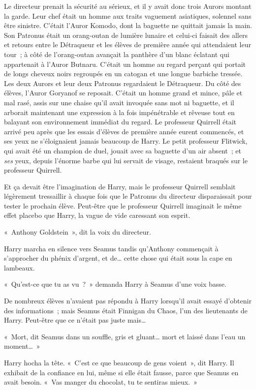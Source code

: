 Le directeur prenait la sécurité au sérieux, et il y avait donc trois Aurors montant la garde.
Leur chef était un homme aux traits vaguement asiatiques, solennel sans être sinistre.
C'était l'Auror Komodo, dont la baguette ne quittait jamais la main.
Son Patronus était un orang-outan de lumière lunaire et celui-ci faisait des allers et retours entre le Détraqueur et les élèves de première année qui attendaient leur tour~; à côté de l'orang-outan avançait la panthère d'un blanc éclatant qui appartenait à l'Auror Butnaru.
C'était un homme au regard perçant qui portait de longs cheveux noirs regroupés en un catogan et une longue barbiche tressée.
Les deux Aurors et leur deux Patronus regardaient le Détraqueur.
Du côté des élèves, l'Auror Goryanof se reposait.
C'était un homme grand et mince, pâle et mal rasé, assis sur une chaise qu'il avait invoquée sans mot ni baguette, et il arborait maintenant une expression à la fois impénétrable et rêveuse tout en balayant son environnement immédiat du regard.
Le professeur Quirrell était arrivé peu après que les essais d'élèves de première année eurent commencés, et ses yeux ne s'éloignaient jamais beaucoup de Harry.
Le petit professeur Flitwick, qui avait été un champion de duel, jouait avec sa baguette d'un air absent~; et \emph{ses} yeux, depuis l'énorme barbe qui lui servait de visage, restaient braqués sur le professeur Quirrell.

Et ça devait être l'imagination de Harry, mais le professeur Quirrell semblait légèrement tressaillir à chaque fois que le Patronus du directeur disparaissait pour tester le prochain élève.
Peut-être que le professeur Quirrell imaginait le même effet placebo que Harry, la vague de vide caressant son esprit.

«~Anthony Goldstein~», dit la voix du directeur.

Harry marcha en silence vers Seamus tandis qu'Anthony commençait à s'approcher du phénix d'argent, et de… cette chose qui était sous la cape en lambeaux.

«~Qu'est-ce que tu as vu~?~»
demanda Harry à Seamus d'une voix basse.

De nombreux élèves n'avaient pas répondu à Harry lorsqu'il avait essayé d'obtenir des informations~; mais Seamus était Finnigan du Chaos, l'un des lieutenants de Harry.
Peut-être que ce n'était pas juste mais…

«~Mort, dit Seamus dans un souffle, gris et gluant… mort et laissé dans l'eau un moment…~»

Harry hocha la tête.
«~C'est ce que beaucoup de gens voient~», dit Harry.
Il exhibait de la confiance en lui, même si elle était fausse, parce que Seamus en avait besoin.
«~Vas manger du chocolat, tu te sentiras mieux.~»

